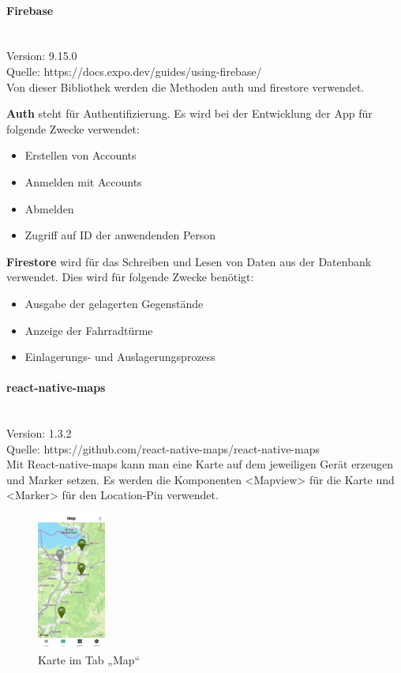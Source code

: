 \bigskip

\paragraph{Firebase}\mbox{}\\
Version: 9.15.0\\
Quelle: https://docs.expo.dev/guides/using-firebase/\\
Von dieser Bibliothek werden die Methoden auth und firestore verwendet.

\noindent\textbf{Auth} steht für Authentifizierung. Es wird bei der Entwicklung der App für folgende Zwecke verwendet:

\begin{itemize}
  \item Erstellen von Accounts
  \item Anmelden mit Accounts
  \item Abmelden
  \item Zugriff auf ID der anwendenden Person
\end{itemize}

\noindent\textbf{Firestore} wird für das Schreiben und Lesen von Daten aus der Datenbank verwendet. Dies wird für folgende Zwecke benötigt:

\begin{itemize}
  \item Ausgabe der gelagerten Gegenstände
  \item Anzeige der Fahrradtürme
  \item Einlagerungs- und Auslagerungsprozess
\end{itemize}

\bigskip

\paragraph{react-native-maps}\mbox{}\\
Version: 1.3.2\\
Quelle: https://github.com/react-native-maps/react-native-maps\\
Mit React-native-maps kann man eine Karte auf dem jeweiligen Gerät erzeugen und Marker setzen. Es werden die Komponenten <Mapview> für die Karte und <Marker> für den \Gls{Location-Pin} verwendet.

\begin{figure}[H]
  \centering
  \includegraphics[width=0.2\textwidth]{images/app-screenshots/tabmap.jpg}
  \caption{Karte im Tab „Map“}
  \label{fig:tabmap}
\end{figure}

